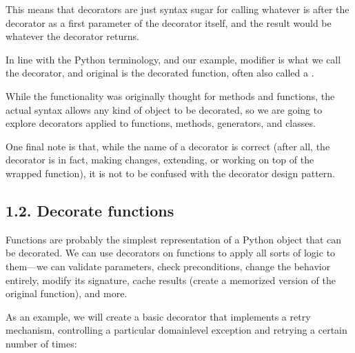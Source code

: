 \documentclass[a4paper,10pt,english]{sphinxmanual}
\begin{document}
This means that decorators are just syntax sugar for calling whatever is after the decorator
as a first parameter of the decorator itself, and the result would be whatever the decorator
returns.

In line with the Python terminology, and our example, modifier is what we call
the decorator, and original is the decorated function, often also called a .

While the functionality was originally thought for methods and functions, the actual syntax
allows any kind of object to be decorated, so we are going to explore decorators applied to
functions, methods, generators, and classes.

One final note is that, while the name of a decorator is correct (after all, the decorator is in
fact, making changes, extending, or working on top of the wrapped function), it is not to be
confused with the decorator design pattern.


\subsection{1.2. Decorate functions}
\label{\detokenize{chapters/5_decorators/index:decorate-functions}}
Functions are probably the simplest representation of a Python object that can be decorated.
We can use decorators on functions to apply all sorts of logic to them—we can validate
parameters, check preconditions, change the behavior entirely, modify its signature, cache
results (create a memorized version of the original function), and more.

As an example, we will create a basic decorator that implements a retry mechanism,
controlling a particular domain\sphinxhyphen{}level exception and retrying a certain number of times:
\end{document}
